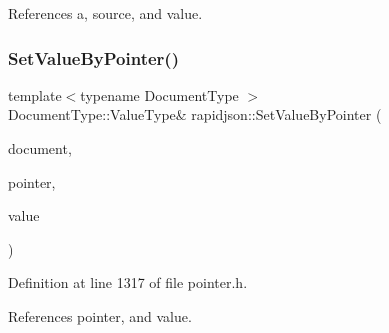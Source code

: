 References a, source, and value.

\mbox{\label{namespacerapidjson_a7ee672e29015d1884533b23769c49dee}} 
\subsubsection{\texorpdfstring{SetValueByPointer()}{SetValueByPointer()}\hspace{0.1cm}{\footnotesize\ttfamily [7/12]}}
{\footnotesize\ttfamily template$<$typename Document\+Type $>$ \\
Document\+Type\+::\+Value\+Type\& rapidjson\+::\+Set\+Value\+By\+Pointer (\begin{DoxyParamCaption}\item[{Document\+Type \&}]{document,  }\item[{const \mbox{\hyperlink{classrapidjson_1_1_generic_pointer}{Generic\+Pointer}}$<$ typename Document\+Type\+::\+Value\+Type $>$ \&}]{pointer,  }\item[{typename Document\+Type\+::\+Value\+Type \&}]{value }\end{DoxyParamCaption})}



Definition at line 1317 of file pointer.\+h.


\begin{DoxyCode}{0}

\end{DoxyCode}


References pointer, and value.

\mbox{\label{namespacerapidjson_a17434145e27de11a23d116f832e62b0e}} 
